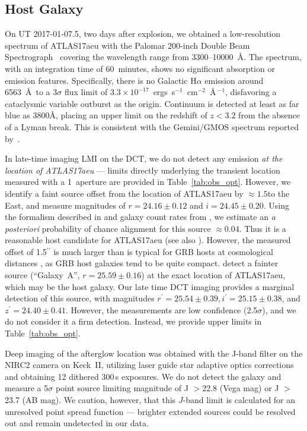 \documentclass[twocolumn]{aastex6}
\begin{document}
\subsection{Host Galaxy}
On UT 2017-01-07.5, two days after explosion, we obtained a low-resolution 
spectrum of ATLAS17aeu with the Palomar 200-inch Double Beam 
Spectrograph~\citep{og82} covering the wavelength range from 3300--10000~\AA. 
The spectrum, with an integration time of 60~minutes, shows no
significant absorption or emission features. Specifically, there is no 
Galactic H$\alpha$ emission around 6563~\AA\ to a 3$\sigma$ flux limit of 
${3.3\times10^{-17}}$~ergs~s$^{-1}$~cm$^{-2}$~\AA\,$^{-1}$, disfavoring a 
cataclysmic variable outburst as the origin.  
Continuum is detected at least as far blue as
3800\AA, placing an upper limit on the redshift of $z<3.2$ from the
absence of a Lyman break. This is consistent with the 
Gemini/GMOS spectrum reported by~\citet{GW170104_Pan}.

In late-time imaging LMI on the DCT, we do not detect any emission
\textit{at the location of ATLAS17aeu} --- limits directly underlying
the transient location measured with a 1\arcsec\ aperture are provided
in Table~\ref{tab:obs_opt}.  However, we identify a faint source offset from the location of
ATLAS17aeu by $\approx 1.5$\arcsec to the East, and measure magnitudes of
$r = 24.16 \pm 0.12$ and $i = 24.45 \pm 0.20$.  Using the formalism described
in \citet{pmm+12} and galaxy count rates from \citet{hpm+97}, we estimate an \textit{a posteriori} probability of chance alignment for this source $\approx 0.04$.  Thus it is a reasonable host candidate for ATLAS17aeu (see also \citealt{GW170104_GRAWITA}).  However, the measured offset of 1.5$^{\prime\prime}$ is much larger than is typical for GRB hosts at cosmological distances \citep{Bloom+2002,Blanchard+2015}, as GRB host galaxies tend to be quite compact.  
\citet{sts+17} detect a fainter source (``Galaxy~A'', $r = 25.59 \pm 0.16$) at the exact location of ATLAS17aeu, which may be the host galaxy. Our late time DCT imaging provides a marginal detection of this source, with magnitudes $r^\prime = 25.54 \pm 0.39, i^\prime = 25.15 \pm 0.38$, and $z^\prime = 24.40 \pm 0.41$. However, the measurements are low confidence (2.5$\sigma$), and we do not consider it a firm detection. Instead, we provide upper limits in Table~\ref{tab:obs_opt}.

Deep imaging of the afterglow location was obtained with the J-band filter 
on the NIRC2 camera on Keck~II, utilizing laser guide star adaptive optics 
corrections and obtaining 12 dithered 300\,s exposures. We do not detect the 
galaxy and measure a 5$\sigma$ point source limiting magnitude of J $>$22.8 (Vega mag) or J $>$ 23.7 (AB mag).
We caution, however, that this $J$-band limit is calculated for an unresolved point spread function --- brighter extended sources could be resolved out and remain undetected in our data.
\end{document}
